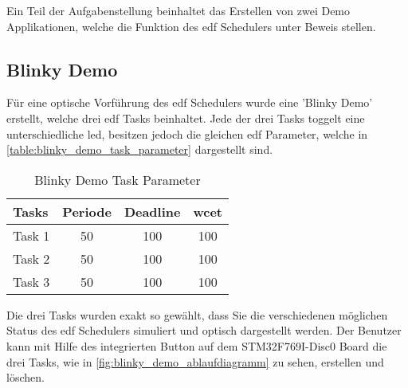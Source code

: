 \documentclass[../EDF Master Thesis.tex]{subfiles}
\begin{document}
    Ein Teil der Aufgabenstellung beinhaltet das Erstellen von zwei Demo Applikationen, welche die Funktion des \ac{edf} Schedulers unter Beweis stellen.

    \subsection{Blinky Demo} \label{section:blinky_demo}
        Für eine optische Vorführung des \ac{edf} Schedulers wurde eine 'Blinky Demo' erstellt, welche drei \ac{edf} Tasks beinhaltet.
        Jede der drei Tasks toggelt eine unterschiedliche \ac{led}, besitzen jedoch die gleichen \ac{edf} Parameter, welche in \autoref{table:blinky_demo_task_parameter} dargestellt sind.

        \begin{table}[ht!]
            \centering
            \begin{tabular}{l|c|c|c}
                Tasks & Periode & Deadline & \ac{wcet} \\
                \hline
                Task 1 & 50 & 100 & 100\\
                Task 2 & 50 & 100 & 100\\
                Task 3 & 50 & 100 & 100\\
            \end{tabular}
            \caption{Blinky Demo Task Parameter}
            \label{table:blinky_demo_task_parameter}
        \end{table}

        Die drei Tasks wurden exakt so gewählt, dass Sie die verschiedenen möglichen Status des \ac{edf} Schedulers simuliert und optisch dargestellt werden.
        Der Benutzer kann mit Hilfe des integrierten Button auf dem STM32F769I-Disc0 Board die drei Tasks, wie in \autoref{fig:blinky_demo_ablaufdiagramm} zu sehen, erstellen und löschen.
        
\end{document}
